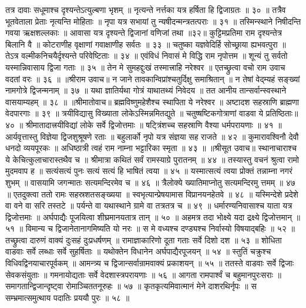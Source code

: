 तत्र दावाः सधूमाश्च दृश्यन्तेऽत्युल्बणा भृशम् ॥
नृत्यन्ते नर्त्तका यत्र हर्षिता हि द्विजाग्रतः ॥ ३० ॥
तत्रैव भूतवेताला प्रेताः नृत्यन्ति मोहिताः ॥
नृपा यत्र सभायां तु न्यषीदन्मन्त्रतत्पराः ॥ ३१ ॥
तस्मिन्स्थाने निषीदन्ति गवया ऋक्षशल्लकाः ॥
आवासा यत्र दृश्यन्ते द्विजानां वणिजां तथा ॥३२॥
कुट्टिमप्रतिमा राम दृश्यन्तेत्र बिलानि वै ॥
कोटराणीह वृक्षाणां गवाक्षाणीह सर्वतः ॥ ३३ ॥
चतुष्का यज्ञवेदिर्हि सोच्छ्राया ह्यभवत्पुरा ॥
तेऽत्र वल्मीकनिचयैर्दृश्यन्ते परिवेष्टिताः ॥ ३४ ॥
एवंविधं निवासं मे विद्धि राम नृपोत्तम ॥
शून्यं तु सर्वतो यस्मान्निवासाय द्विजा गताः ॥ ३५ ॥
तेन मे सुमहद्दुःखं तस्मात्त्राहि नरेश्वर ॥
एतच्छ्रुत्वा वचो राम उवाच वदतां वरः ॥ ३६ ॥
॥श्रीराम उवाच॥
न जाने तावकान्विप्रांश्चतुर्दिक्षु समाश्रितान् ॥
न तेषां वेद्म्यहं सङ्ख्यां नामगोत्रे द्विजन्मनाम् ॥ ३७ ॥
यथा ज्ञातिर्यथा गोत्रं याथातथ्यं निवेदय ॥
तत आनीय तान्सर्वान्स्वस्थाने वासयाम्यहम् ॥ ३८ ॥
॥श्रीमातोवाच॥
ब्रह्मविष्णुमहेशैश्च स्थापिता ये नरेश्वर ॥
अष्टादश सहस्राणि ब्राह्मणा वेदपारगाः ॥ ३९ ॥
त्रयीविद्यासु विख्याता लोकेऽस्मिन्नमितद्युते ॥
चतुष्षष्टिकगोत्राणां वाडवा ये प्रतिष्ठिताः॥ ४० ॥
श्रीमातादात्त्रयीविद्यां लोके सर्वे द्विजोत्तमाः ॥
षट्त्रिंशच्च सहस्राणि वैश्या धर्मपरायणाः ॥ ४१ ॥
आर्यवृत्तास्तु विज्ञेया द्विजशुश्रूषणे रताः ॥
बहुलार्को नृपो यत्र संज्ञया सह राजते ॥ ४२ ॥
कुमारावश्विनौ देवौ धनदो व्ययपूरकः ॥
अधिष्ठात्री त्वहं राम नाम्ना भट्टारिका स्मृता ॥ ४३ ॥
॥श्रीसूत उवाच॥
स्थानाचाराश्च ये केचित्कुलाचारास्तथैव च ॥
श्रीमात्रा कथितं सर्वं रामस्याग्रे पुरातनम् ॥ ४४ ॥
तस्यास्तु वचनं श्रुत्वा रामो मुदमवाप ह ॥
सत्यंसत्यं पुनः सत्यं सत्यं हि भाषितं त्वया ॥ ४५ ॥
यस्मात्सत्यं त्वया प्रोक्तं तन्नाम्ना नगरं शुभम् ॥
वासयामि जगन्मातः सत्यमन्दिरमेव च ॥ ४६ ॥
त्रैलोक्ये ख्यातिमाप्नोतु सत्यमन्दिरमु त्तमम् ॥ ४७ ॥
एतदुक्त्वा ततो रामः सहस्रशतसङ्ख्यया ॥
स्वभृत्यान्प्रेषयामास विप्रानयनहेतवे ॥ ४८ ॥
यस्मिन्देशे प्रदेशे वा वने वा सरि तस्तटे ॥
पर्यन्ते वा यथास्थाने ग्रामे वा तत्रतत्र च ॥ ४९ ॥
धर्मारण्यनिवासाश्च याता यत्र द्विजोत्तमाः ॥
अर्घपाद्यैः पूजयित्वा शीघ्रमानयतात्र तान् ॥ ५० ॥
अहमत्र तदा भोक्ष्ये यदा द्रक्ष्ये द्विजोत्तमान् ॥ ५१ ॥
विमान्य च द्विजानेतानागमिष्यति यो नरः ॥
स मे वध्यश्च दण्ड्यश्च निर्वास्यो विषयाद्बहिः ॥ ५२ ॥
तच्छ्रुत्वा दारुणं वाक्यं दुःसहं दुःप्रधर्षणम् ॥
रामाज्ञाकारिणो दूता गताः सर्वे दिशो दश ॥ ५३ ॥
शोधिता वाडवाः सर्वे लब्धाः सर्वे सुहर्षिताः ॥
यथोक्तेन विधानेन अर्घपाद्यैरपूजयन् ॥ ५४ ॥
स्तुतिं चक्रुश्च विधिवद्विनयाचारपूर्वकम् ॥
आमन्त्र्य च द्विजान्सर्वान्रामवाक्यं प्रकाशयन् ॥ ५५ ॥
ततस्ते वाडवाः सर्वे द्विजाः सेवकसंयुताः ॥
गमनायोद्यताः सर्वे वेदशास्त्रपरायणाः ॥ ५६ ॥
आगता रामपार्श्वं च बहुमानपुरःसराः ॥
समागतान्द्विजान्दृष्ट्वा रोमाञ्चिततनूरुहः ॥ ५७ ॥
कृतकृत्यमिवात्मानं मेने दाशरथिर्नृपः ॥
स सम्भ्रमात्समुत्थाय पदातिः प्रययौ पुरः ॥ ५८ ॥
